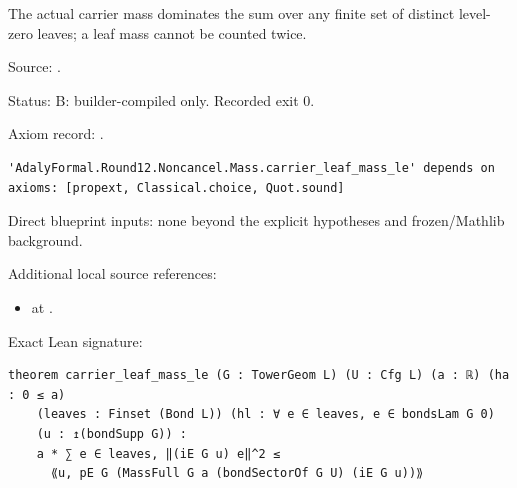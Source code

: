 \begin{theorem}[bp-212]
\label{bp-212}
\uses{}
\leanok
The actual carrier mass dominates the sum over any finite set of distinct level-zero leaves; a leaf mass cannot be counted twice.

\par Source: \texttt{}.
\par Status: B: builder-compiled only. Recorded exit 0.
\par Axiom record: \texttt{}.
\begin{verbatim}
'AdalyFormal.Round12.Noncancel.Mass.carrier_leaf_mass_le' depends on axioms: [propext, Classical.choice, Quot.sound]
\end{verbatim}
\par Direct blueprint inputs: none beyond the explicit hypotheses and frozen/Mathlib background.
\par Additional local source references:
\begin{itemize}
\item \texttt{} at \texttt{}.
\end{itemize}
\par Exact Lean signature:
\begin{verbatim}
theorem carrier_leaf_mass_le (G : TowerGeom L) (U : Cfg L) (a : ℝ) (ha : 0 ≤ a)
    (leaves : Finset (Bond L)) (hl : ∀ e ∈ leaves, e ∈ bondsLam G 0)
    (u : ↥(bondSupp G)) :
    a * ∑ e ∈ leaves, ‖(iE G u) e‖^2 ≤
      ⟪u, pE G (MassFull G a (bondSectorOf G U) (iE G u))⟫
\end{verbatim}
\end{theorem}

